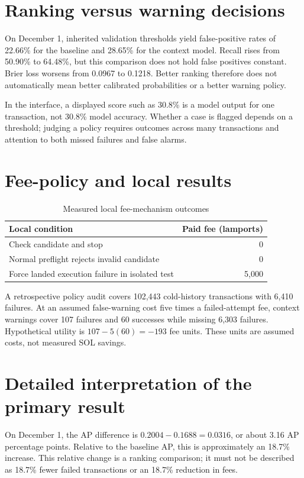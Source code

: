 \documentclass[12pt,a4paper,oneside]{report}
\begin{document}
\section{Ranking versus warning decisions}
On December 1, inherited validation thresholds yield false-positive rates of 22.66\% for the baseline and 28.65\% for the context model. Recall rises from 50.90\% to 64.48\%, but this comparison does not hold false positives constant. Brier loss worsens from 0.0967 to 0.1218. Better ranking therefore does not automatically mean better calibrated probabilities or a better warning policy.

In the interface, a displayed score such as 30.8\% is a model output for one transaction, not 30.8\% model accuracy. Whether a case is flagged depends on a threshold; judging a policy requires outcomes across many transactions and attention to both missed failures and false alarms.
\section{Fee-policy and local results}
\begin{table}[ht]\centering\caption{Measured local fee-mechanism outcomes}
\begin{tabularx}{\textwidth}{Y r}\toprule Local condition&Paid fee (lamports)\\\midrule Check candidate and stop&0\\Normal preflight rejects invalid candidate&0\\Force landed execution failure in isolated test&5,000\\\bottomrule\end{tabularx}\end{table}
A retrospective policy audit covers 102,443 cold-history transactions with 6,410 failures. At an assumed false-warning cost five times a failed-attempt fee, context warnings cover 107 failures and 60 successes while missing 6,303 failures. Hypothetical utility is $107-5(60)=-193$ fee units. These units are assumed costs, not measured SOL savings.

\section{Detailed interpretation of the primary result}
On December 1, the AP difference is $0.2004-0.1688=0.0316$, or about 3.16 AP percentage points. Relative to the baseline AP, this is approximately an 18.7\% increase. This relative change is a ranking comparison; it must not be described as 18.7\% fewer failed transactions or an 18.7\% reduction in fees.
\end{document}
